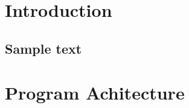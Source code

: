 \documentclass[12pt,a4paper]{refart}
\begin{document}
\clearpage


\section{Introduction}

\subsection{Sample text}




\clearpage





\clearpage







\clearpage

\section{Program Achitecture}



\clearpage




\end{document}

